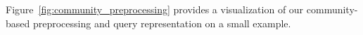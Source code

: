 Figure~\ref{fig:community_preprocessing} provides a visualization of our community-based preprocessing and query representation on a small example. 

\begin{algorithm}[ht!]%
    \caption{Base knowledge graph representation}
    \label{algorithm:baseline}
    \begin{algorithmic}[1]
    \end{algorithmic}
\end{algorithm}
 
